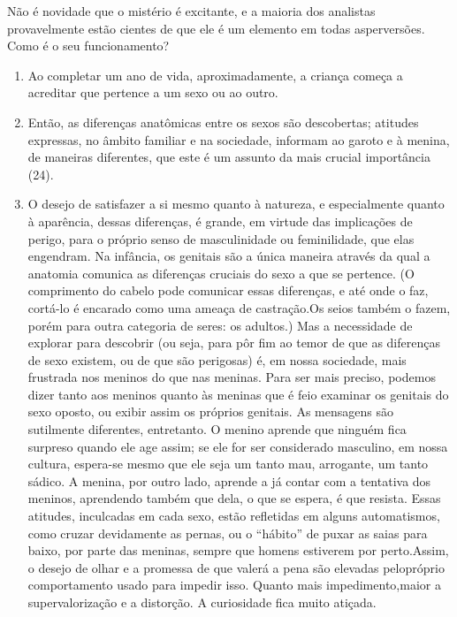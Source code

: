 Não é novidade que o mistério é excitante, e a maioria dos analistas
provavelmente estão cientes de que ele é um elemento em todas as\idxconfemeni[|)]
perversões. Como é o seu funcionamento?

\begin{enumerate}
	
\item Ao completar um ano de vida, aproximadamente, a criança começa a
acreditar que pertence a um sexo ou ao outro.

\item Então, as diferenças anatômicas entre os sexos são descobertas;
atitudes expressas, no âmbito familiar e na sociedade, informam ao
garoto e à menina, de maneiras diferentes, que este é um assunto da
mais crucial importância (24).

\item O desejo de satisfazer a si mesmo quanto à natureza, e
especialmente quanto à aparência, dessas diferenças, é grande, em
virtude das implicações de perigo, para o próprio senso de
masculinidade ou feminilidade, que elas engendram. Na infância, os
genitais são a única maneira através da qual a anatomia comunica as
diferenças cruciais do sexo a que se pertence. (O comprimento do cabelo
pode comunicar essas diferenças, e até onde o faz, cortá-lo é encarado
como uma ameaça de castração.\idxcastaconf[|(] Os seios também o fazem, porém para outra
categoria de seres: os adultos.) Mas a necessidade de explorar para
descobrir (ou seja, para pôr fim ao temor de que as diferenças de sexo
existem, ou de que são perigosas) é, em nossa sociedade, mais frustrada
nos meninos do que nas meninas. Para ser mais preciso,\idxinfanexib{} podemos dizer
tanto aos meninos quanto às meninas que é feio examinar os genitais do
sexo oposto, ou exibir assim os próprios genitais.\idxexibiinfa{} As mensagens são
sutilmente diferentes, entretanto. O menino aprende que ninguém fica
surpreso quando ele age assim; se ele for ser considerado masculino, em
nossa cultura, espera-se mesmo que ele seja um tanto mau, arrogante, um
tanto sádico. A menina, por outro lado, aprende a já contar com a
tentativa dos meninos, aprendendo também que dela, o que se espera, é
que resista. Essas atitudes, inculcadas em cada sexo, estão refletidas
em alguns automatismos, como cruzar devidamente as pernas, ou o
``hábito'' de puxar as saias para baixo, por
parte das meninas, sempre que homens estiverem por perto.\idxmist[|)] Assim, o
desejo de olhar\idxvoy{} e a promessa de que valerá a pena são elevadas pelo\idxsexueinf[|)]
próprio comportamento usado para impedir isso. Quanto mais impedimento,\idxsexuedif[|)]
maior a supervalorização e a distorção.\idxinfancurio{} A curiosidade\idxgenetgenicuri{} fica muito
atiçada.


\end{enumerate}
